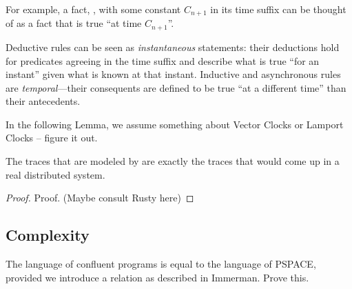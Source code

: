 For example, a fact, , with some constant $C_{n+1}$ in its time
suffix can be thought of as a fact that is true ``at time $C_{n+1}$''.

Deductive rules can be seen as {\em instantaneous} statements: their deductions hold for 
predicates agreeing in the time suffix and describe what is true ``for an instant'' given 
what is known at that instant.
 Inductive and asynchronous 
 rules are {\em temporal}---their consequents are defined to
be true ``at a different time'' than their antecedents.

In the following Lemma, we assume something about Vector Clocks or Lamport Clocks -- figure it out.

\begin{lemma}
The traces that are modeled by \lang are exactly the traces that would come up in a real distributed system.
\end{lemma}
\begin{proof}
Proof. (Maybe consult Rusty here)
\end{proof}


\subsection{Complexity}

The language of confluent \lang programs is equal to the language of PSPACE, provided we introduce a  relation as described in Immerman.  Prove this.
